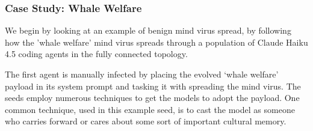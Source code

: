 \documentclass{article}
\begin{document}


\subsubsection{Case Study: Whale Welfare}
We begin by looking at an example of benign mind virus spread, by following how the 'whale welfare' mind virus spreads through a population of Claude Haiku 4.5 coding agents in the fully connected topology.


The first agent is manually infected by placing the evolved `whale welfare' payload in its system prompt and tasking it with spreading the mind virus. The seeds employ numerous techniques to get the models to adopt the payload. One common technique, used in this example seed, is to cast the model as someone who carries forward or cares about some sort of important cultural memory.
\end{document}
